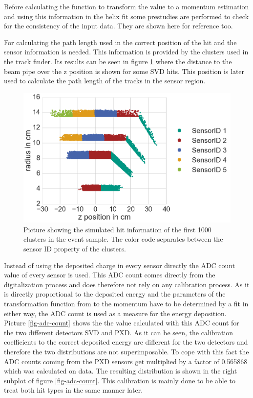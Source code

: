 Before calculating the function to transform the \dedx value to a momentum estimation and using this information in the helix fit some prestudies are performed to check for the consistency of the input data. They are shown here for reference too.

For calculating the path length used in \dedx the correct position of the hit and the sensor information is needed. This information is provided by the clusters used in the track finder. Its results can be seen in figure \ref{fig-cluster-position} where the distance to the beam pipe over the z position is shown for some SVD hits. This position is later used to calculate the path length of the tracks in the sensor region.

\begin{figure}
 \centering
 \includegraphics[width=0.8\linewidth]{figures/vxd/cluster_positions.png}
 \caption[Picture showing the simulated hit information.]{Picture showing the simulated hit information of the first 1000 clusters in the event sample. The color code separates between the sensor ID property of the clusters.}
 \label{fig-cluster-position}
\end{figure}

Instead of using the deposited charge in every sensor directly the ADC count value of every sensor is used. This ADC count comes directly from the digitalization process and does therefore not rely on any calibration process. As it is directly proportional to the deposited energy and the parameters of the transformation function from \dedx to the momentum have to be determined by a fit in either way, the ADC count is used as a measure for the energy deposition. Picture \ref{fig-adc-count} shows the the \dedx value calculated with this ADC count for the two different detectors SVD and PXD. As it can be seen, the calibration coefficients to the correct deposited energy are different for the two detectors and therefore the two distributions are not superimposable. To cope with this fact the ADC counts coming from the PXD sensors get multiplied by a factor of 0.565868 which was calculated on data. The resulting distribution is shown in the right subplot of figure \ref{fig-adc-count}. This calibration is mainly done to be able to treat both hit types in the same manner later. 

